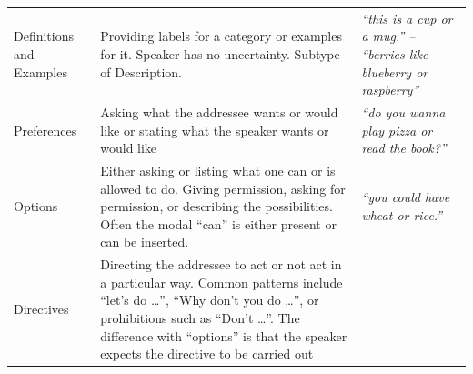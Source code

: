 \documentclass[oneside]{report}
\theoremstyle{definition}
\theoremstyle{definition}
\theoremstyle{definition}
\theoremstyle{remark}
\begin{document}
\begin{longtable}[]{@{}lll@{}}
\begin{minipage}[t]{0.14\columnwidth}\raggedright\strut
Definitions and Examples\strut
\end{minipage} & \begin{minipage}[t]{0.44\columnwidth}\raggedright\strut
Providing labels for a category or examples for it. Speaker has no
uncertainty. Subtype of Description.\strut
\end{minipage} & \begin{minipage}[t]{0.33\columnwidth}\raggedright\strut
\emph{``this is a cup or a mug.'' -- ``berries like blueberry or
raspberry''}\strut
\end{minipage}\tabularnewline
\begin{minipage}[t]{0.14\columnwidth}\raggedright\strut
Preferences\strut
\end{minipage} & \begin{minipage}[t]{0.44\columnwidth}\raggedright\strut
Asking what the addressee wants or would like or stating what the
speaker wants or would like\strut
\end{minipage} & \begin{minipage}[t]{0.33\columnwidth}\raggedright\strut
\emph{``do you wanna play pizza or read the book?''}\strut
\end{minipage}\tabularnewline
\begin{minipage}[t]{0.14\columnwidth}\raggedright\strut
Options\strut
\end{minipage} & \begin{minipage}[t]{0.44\columnwidth}\raggedright\strut
Either asking or listing what one can or is allowed to do. Giving
permission, asking for permission, or describing the possibilities.
Often the modal ``can'' is either present or can be inserted.\strut
\end{minipage} & \begin{minipage}[t]{0.33\columnwidth}\raggedright\strut
\emph{``you could have wheat or rice.''}\strut
\end{minipage}\tabularnewline
\begin{minipage}[t]{0.14\columnwidth}\raggedright\strut
Directives\strut
\end{minipage} & \begin{minipage}[t]{0.44\columnwidth}\raggedright\strut
Directing the addressee to act or not act in a particular way. Common
patterns include ``let's do \ldots{}'', ``Why don't you do \ldots{}'',
or prohibitions such as ``Don't \ldots{}''. The difference with
``options'' is that the speaker expects the directive to be carried out

\end{minipage}
\end{longtable}
\end{document}
